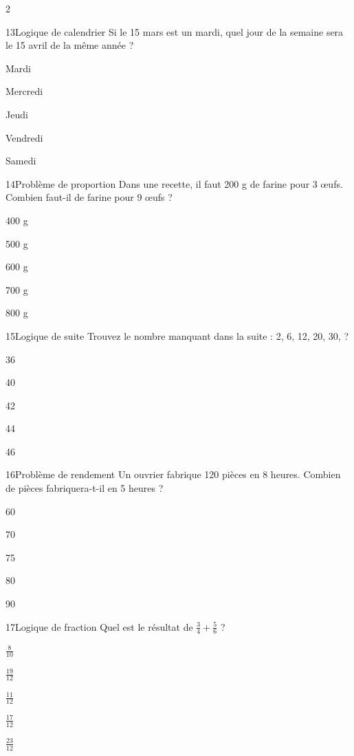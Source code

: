 \begin{multicols}{2}
\begin{question}{13}{Logique de calendrier}
Si le 15 mars est un mardi, quel jour de la semaine sera le 15 avril de la même année ?
\begin{enumeratebf}
\item Mardi
\item Mercredi
\item Jeudi
\item Vendredi
\item Samedi
\end{enumeratebf}
\end{question}

\begin{question}{14}{Problème de proportion}
Dans une recette, il faut 200 g de farine pour 3 œufs. Combien faut-il de farine pour 9 œufs ?
\begin{enumeratebf}
\item 400 g
\item 500 g
\item 600 g
\item 700 g
\item 800 g
\end{enumeratebf}
\end{question}

\begin{question}{15}{Logique de suite}
Trouvez le nombre manquant dans la suite : 2, 6, 12, 20, 30, ?
\begin{enumeratebf}
\item 36
\item 40
\item 42
\item 44
\item 46
\end{enumeratebf}
\end{question}

\begin{question}{16}{Problème de rendement}
Un ouvrier fabrique 120 pièces en 8 heures. Combien de pièces fabriquera-t-il en 5 heures ?
\begin{enumeratebf}
\item 60
\item 70
\item 75
\item 80
\item 90
\end{enumeratebf}
\end{question}

\begin{question}{17}{Logique de fraction}
Quel est le résultat de \( \frac{3}{4} + \frac{5}{6} \) ?
\begin{enumeratebf}
\item \( \frac{8}{10} \)
\item \( \frac{19}{12} \)
\item \( \frac{11}{12} \)
\item \( \frac{17}{12} \)
\item \( \frac{23}{12} \)
\end{enumeratebf}
\end{question}


\end{multicols}
